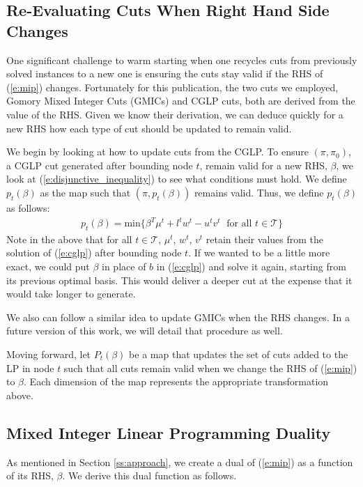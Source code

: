 \documentclass[10pt]{article}
\begin{document}
	\subsection{Re-Evaluating Cuts When Right Hand Side Changes} \label{ss:rhs}
	One significant challenge to warm starting when one recycles cuts from previously solved instances to a new one is ensuring the cuts stay valid if the RHS of (\ref{e:mip}) changes. Fortunately for this publication, the two cuts we employed, Gomory Mixed Integer Cuts (GMICs) and CGLP cuts, both are derived from the value of the RHS. Given we know their derivation, we can deduce quickly for a new RHS how each type of cut should be updated to remain valid.
	
	We begin by looking at how to update cuts from the CGLP. To ensure $ (\pi, \pi_0) $, a CGLP cut generated after bounding node $ t $, remain valid for a new RHS, $ \beta $, we look at (\ref{e:disjunctive_inequality}) to see what conditions must hold. We define $ p_t(\beta) $ as the map such that $ (\pi, p_t(\beta)) $ remains valid. Thus, we define $ p_t(\beta) $ as follows:
	\begin{align}
		p_t(\beta) = \text{min} \{\beta^T \mu^t + l^t w^t - u^t v^t \; \text{ for all } t \in \mathcal{T}\} \label{e:updated_cglp_approx}
	\end{align}
	Note in the above that for all $ t \in \mathcal{T} $, $ \mu^t $, $ w^t $, $ v^t $ retain their values from the solution of (\ref{e:cglp}) after bounding node $ t $. If we wanted to be a little more exact, we could put $ \beta $ in place of $ b $ in (\ref{e:cglp}) and solve it again, starting from its previous optimal basis. This would deliver a deeper cut at the expense that it would take longer to generate.
	
	We also can follow a similar idea to update GMICs when the RHS changes. In a future version of this work, we will detail that procedure as well.
	
	Moving forward, let $ P_t(\beta) $ be a map that updates the set of cuts added to the LP in node $ t $ such that all cuts remain valid when we change the RHS of (\ref{e:mip}) to $ \beta $. Each dimension of the map represents the appropriate transformation above.
	
	\subsection{Mixed Integer Linear Programming Duality} \label{ss:duality}
	As mentioned in Section \ref{ss:approach}, we create a dual of (\ref{e:mip}) as a function of its RHS, $ \beta $. We derive this dual function as follows.
	
\end{document}
